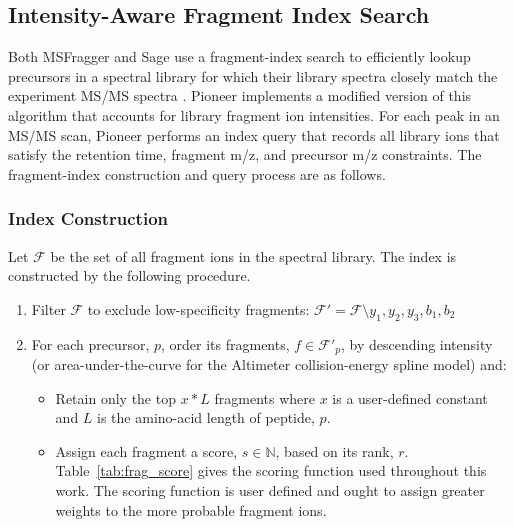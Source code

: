 \documentclass[pdflatex,sn-nature]{sn-jnl}
\begin{document}
\subsection{Intensity-Aware Fragment Index Search}\label{subsec:fragment-index-search}

Both MSFragger and Sage use a fragment-index search to efficiently lookup precursors in a spectral library for which their library spectra closely match the experiment MS/MS spectra \cite{Kong2017-gg,Lazear2023-ci}. Pioneer implements a modified version of this algorithm that accounts for library fragment ion intensities. For each peak in an MS/MS scan, Pioneer performs an index query that records all library ions that satisfy the retention time, fragment m/z, and precursor m/z constraints. The fragment-index construction and query process are as follows.

\subsubsection{Index Construction}\label{subsubsec:index-construction}
Let $\mathcal{F}$ be the set of all fragment ions in the spectral library. The index is constructed by the following procedure.

\begin{enumerate}
\item Filter $\mathcal{F}$ to exclude low-specificity fragments: $\mathcal{F}' = \mathcal{F} \setminus {y_1, y_2, y_3, b_1, b_2}$
\item For each precursor, $p$, order its fragments, $f \in \mathcal{F}'_p$, by descending intensity (or area-under-the-curve for the Altimeter collision-energy spline model) and:
    \begin{itemize}
        \item Retain only the top $x*L$ fragments where $x$ is a user-defined constant and $L$ is the amino-acid length of peptide, $p$.
        \item Assign each fragment a score, $s \in \mathbb{N}$, based on its rank, $r$. Table~\ref{tab:frag_score} gives the scoring function used throughout this work. The scoring function is user defined and ought to assign greater weights to the more probable fragment ions. 
    \end{itemize}
\end{enumerate}
\end{document}
